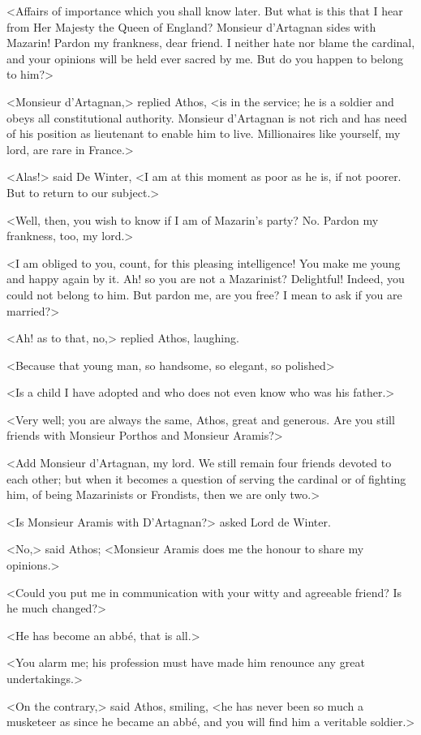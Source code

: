 <Affairs of importance which you shall know later. But what is this that I hear from Her Majesty the Queen of England? Monsieur d'Artagnan sides with Mazarin! Pardon my frankness, dear friend. I neither hate nor blame the cardinal, and your opinions will be held ever sacred by me. But do you happen to belong to him?>

<Monsieur d'Artagnan,> replied Athos, <is in the service; he is a soldier and obeys all constitutional authority. Monsieur d'Artagnan is not rich and has need of his position as lieutenant to enable him to live. Millionaires like yourself, my lord, are rare in France.>

<Alas!> said De Winter, <I am at this moment as poor as he is, if not poorer. But to return to our subject.>

<Well, then, you wish to know if I am of Mazarin's party? No. Pardon my frankness, too, my lord.>

<I am obliged to you, count, for this pleasing intelligence! You make me young and happy again by it. Ah! so you are not a Mazarinist? Delightful! Indeed, you could not belong to him. But pardon me, are you free? I mean to ask if you are married?>

<Ah! as to that, no,> replied Athos, laughing.

<Because that young man, so handsome, so elegant, so polished\longdash>

<Is a child I have adopted and who does not even know who was his father.>

<Very well; you are always the same, Athos, great and generous. Are you still friends with Monsieur Porthos and Monsieur Aramis?>

<Add Monsieur d'Artagnan, my lord. We still remain four friends devoted to each other; but when it becomes a question of serving the cardinal or of fighting him, of being Mazarinists or Frondists, then we are only two.>

<Is Monsieur Aramis with D'Artagnan?> asked Lord de Winter.

<No,> said Athos; <Monsieur Aramis does me the honour to share my opinions.>

<Could you put me in communication with your witty and agreeable friend? Is he much changed?>

<He has become an abbé, that is all.>

<You alarm me; his profession must have made him renounce any great undertakings.>

<On the contrary,> said Athos, smiling, <he has never been so much a musketeer as since he became an abbé, and you will find him a veritable soldier.>

